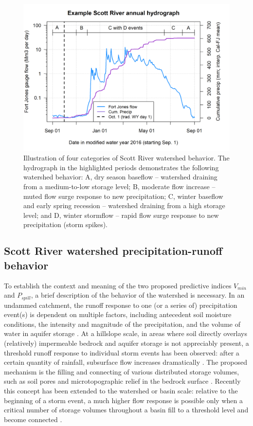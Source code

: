\documentclass[hess, manuscript]{copernicus}
\begin{document}
\begin{figure}
\includegraphics[width=1\linewidth]{f02} \caption{\label{fig:watershed_4states_illustration} Illustration of four categories of Scott River watershed behavior. The hydrograph in the highlighted periods demonstrates the following watershed behavior: A, dry season baseflow -- watershed draining from a medium-to-low storage level; B, moderate flow increase  -- muted flow surge response to new precipitation; C, winter baseflow and early spring recession -- watershed draining from a high storage level; and D, winter stormflow -- rapid flow surge response to new precipitation (storm spikes).}\label{fig:watershed_4states_illustration}
\end{figure}

\subsection{Scott River watershed precipitation-runoff behavior}

To establish the context and meaning of the two proposed predictive
indices \(V_{min}\) and \(P_{spill}\), a brief description of the
behavior of the watershed is necessary. In an undammed catchment, the
runoff response to one (or a series of) precipitation event(s) is
dependent on multiple factors, including antecedent soil moisture
conditions, the intensity and magnitude of the precipitation, and the
volume of water in aquifer storage \citep{Tarboton2003}. At a hillslope
scale, in areas where soil directly overlays (relatively) impermeable
bedrock and aquifer storage is not appreciably present, a threshold
runoff response to individual storm events has been observed: after a
certain quantity of rainfall, subsurface flow increases dramatically
\citep{Tromp-VanMeerveld2006}. The proposed mechanism is the filling and
connecting of various distributed storage volumes, such as soil pores
and microtopographic relief in the bedrock surface
\citep{Tromp-VanMeerveld2006}. Recently this concept has been extended
to the watershed or basin scale: relative to the beginning of a storm
event, a much higher flow response is possible only when a critical
number of storage volumes throughout a basin fill to a threshold level
and become connected \citep{McDonnell2021}.
\end{document}
